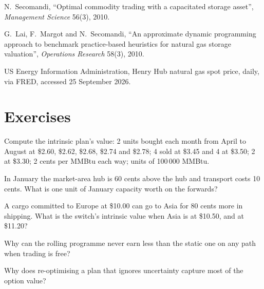 \begin{omsources}
\item N.~Secomandi, ``Optimal commodity trading with a capacitated storage asset'', \emph{Management Science} 56(3), 2010.
\item G.~Lai, F.~Margot and N.~Secomandi, ``An approximate dynamic programming approach to benchmark practice-based heuristics for natural gas
storage valuation'', \emph{Operations Research} 58(3), 2010.
\item US Energy Information Administration, Henry Hub natural gas spot price, daily, via FRED, accessed 25 September 2026.
\end{omsources}

\section{Exercises}

\begin{exercise}[$\star$]\label{exo:s2:storage-transport-and-physical-optionality:1}
Compute the intrinsic plan's value: 2 units bought each month from April to August at \$2.60, \$2.62, \$2.68, \$2.74 and \$2.78; 4 sold at \$3.45 and
4 at \$3.50; 2 at \$3.30; 2 cents per MMBtu each way; units of 100\,000 MMBtu.
\end{exercise}

\begin{exercise}[$\star$]\label{exo:s2:storage-transport-and-physical-optionality:2}
In January the market-area hub is 60 cents above the hub and transport costs 10 cents. What is one unit of January capacity worth on the forwards?
\end{exercise}

\begin{exercise}[$\star$]\label{exo:s2:storage-transport-and-physical-optionality:3}
A cargo committed to Europe at \$10.00 can go to Asia for 80 cents more in shipping. What is the switch's intrinsic value when Asia is at \$10.50,
and at \$11.20?
\end{exercise}

\begin{exercise}[$\star\star$]\label{exo:s2:storage-transport-and-physical-optionality:4}
Why can the rolling programme never earn less than the static one on any path when trading is free?
\end{exercise}

\begin{exercise}[$\star\star$]\label{exo:s2:storage-transport-and-physical-optionality:5}
Why does re-optimising a plan that ignores uncertainty capture most of the option value?
\end{exercise}

